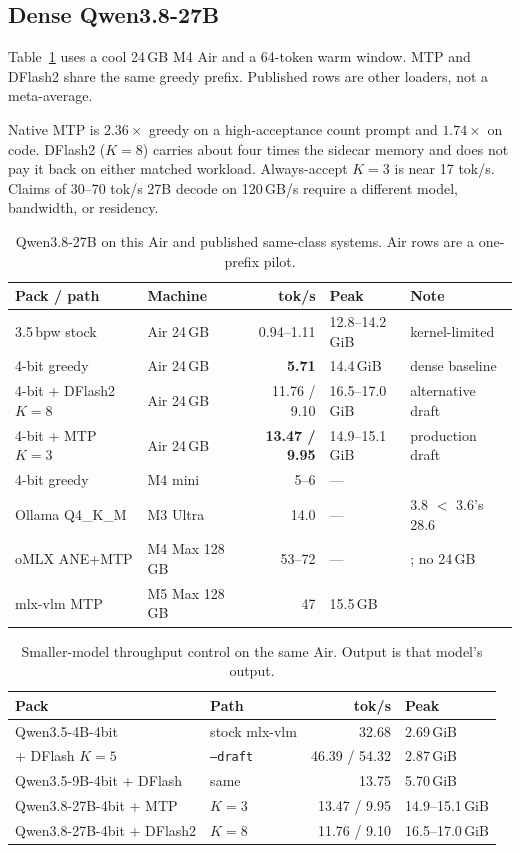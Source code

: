 \documentclass[11pt]{article}
\theoremstyle{definition}
\begin{document}
\subsection{Dense Qwen3.8-27B}
\label{sec:eval-27b}

Table~\ref{tab:27b} uses a cool 24\,GB M4 Air and a 64-token warm window. MTP and DFlash2 share the same greedy prefix. Published rows are other loaders, not a meta-average.

Native MTP is $2.36{\times}$ greedy on a high-acceptance count prompt and $1.74{\times}$ on code. DFlash2 ($K{=}8$) carries about four times the sidecar memory and does not pay it back on either matched workload. Always-accept $K{=}3$ is near 17 tok/s. Claims of 30--70 tok/s 27B decode on 120\,GB/s require a different model, bandwidth, or residency.

\begin{table}[t]
\centering
\caption{Qwen3.8-27B on this Air and published same-class systems. Air rows are a one-prefix pilot.}
\label{tab:27b}
\scriptsize
\begin{tabular}{@{}llrll@{}}
\toprule
Pack / path & Machine & tok/s & Peak & Note \\
\midrule
3.5\,bpw stock & Air 24\,GB & 0.94--1.11 & 12.8--14.2\,GiB & kernel-limited \\
4-bit greedy & Air 24\,GB & \textbf{5.71} & 14.4\,GiB & dense baseline \\
4-bit + DFlash2 $K{=}8$ & Air 24\,GB & 11.76 / 9.10 & 16.5--17.0\,GiB & alternative draft \\
4-bit + MTP $K{=}3$ & Air 24\,GB & \textbf{13.47 / 9.95} & 14.9--15.1\,GiB & production draft \\
4-bit greedy & M4 mini & 5--6 & --- & \citet{orcarouter2026} \\
Ollama Q4\_K\_M & M3 Ultra & 14.0 & --- & 3.8 $<$ 3.6's 28.6~\citep{terminalbytes2026} \\
oMLX ANE+MTP & M4 Max 128\,GB & 53--72 & --- & \citet{weschera2026}; no 24\,GB \\
mlx-vlm MTP & M5 Max 128\,GB & 47 & 15.5\,GB & \citet{nathanmaine} \\
\bottomrule
\end{tabular}
\end{table}

\begin{table}[t]
\centering
\caption{Smaller-model throughput control on the same Air. Output is that model’s output.}
\label{tab:4b}
\small
\begin{tabular}{@{}llrl@{}}
\toprule
Pack & Path & tok/s & Peak \\
\midrule
Qwen3.5-4B-4bit & stock mlx-vlm & 32.68 & 2.69\,GiB \\
+ DFlash $K{=}5$ & \texttt{--draft} & 46.39 / 54.32 & 2.87\,GiB \\
Qwen3.5-9B-4bit + DFlash & same & 13.75 & 5.70\,GiB \\
Qwen3.8-27B-4bit + MTP & $K{=}3$ & 13.47 / 9.95 & 14.9--15.1\,GiB \\
Qwen3.8-27B-4bit + DFlash2 & $K{=}8$ & 11.76 / 9.10 & 16.5--17.0\,GiB \\
\bottomrule
\end{tabular}
\end{table}
\end{document}
